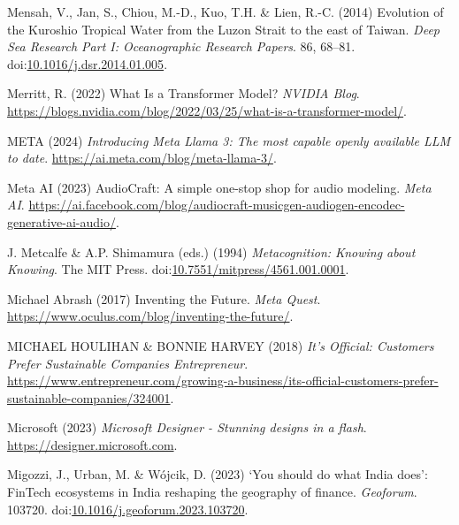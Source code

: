 \documentclass[
  letterpaper,
  DIV=11,
  numbers=noendperiod]{scrartcl}
\newlength{\cslhangindent}
\newenvironment{CSLReferences}[2] %
 {\begin{list}{}{%
  \setlength{\itemindent}{0pt}
  \setlength{\leftmargin}{0pt}
  \setlength{\parsep}{0pt}
  \ifodd #1
   \setlength{\leftmargin}{\cslhangindent}
   \setlength{\itemindent}{-1\cslhangindent}
  \fi
  \setlength{\itemsep}{#2\baselineskip}}}
 {\end{list}}
\begin{document}
\begin{CSLReferences}{0}{1}
Mensah, V., Jan, S., Chiou, M.-D., Kuo, T.H. \& Lien, R.-C. (2014)
Evolution of the {Kuroshio Tropical Water} from the {Luzon Strait} to
the east of {Taiwan}. \emph{Deep Sea Research Part I: Oceanographic
Research Papers}. 86, 68--81.
doi:\href{https://doi.org/10.1016/j.dsr.2014.01.005}{10.1016/j.dsr.2014.01.005}.

Merritt, R. (2022) What {Is} a {Transformer Model}? \emph{NVIDIA Blog}.
\url{https://blogs.nvidia.com/blog/2022/03/25/what-is-a-transformer-model/}.

META (2024) \emph{Introducing {Meta Llama} 3: {The} most capable openly
available {LLM} to date}. \url{https://ai.meta.com/blog/meta-llama-3/}.

Meta AI (2023) {AudioCraft}: {A} simple one-stop shop for audio
modeling. \emph{Meta AI}.
\url{https://ai.facebook.com/blog/audiocraft-musicgen-audiogen-encodec-generative-ai-audio/}.

J. Metcalfe \& A.P. Shimamura (eds.) (1994) \emph{Metacognition:
{Knowing} about {Knowing}}. The MIT Press.
doi:\href{https://doi.org/10.7551/mitpress/4561.001.0001}{10.7551/mitpress/4561.001.0001}.

Michael Abrash (2017) Inventing the {Future}. \emph{Meta Quest}.
\url{https://www.oculus.com/blog/inventing-the-future/}.

MICHAEL HOULIHAN \& BONNIE HARVEY (2018) \emph{It's {Official}:
{Customers Prefer Sustainable Companies} {\textbar} {Entrepreneur}}.
\url{https://www.entrepreneur.com/growing-a-business/its-official-customers-prefer-sustainable-companies/324001}.

Microsoft (2023) \emph{Microsoft {Designer} - {Stunning} designs in a
flash}. \url{https://designer.microsoft.com}.

Migozzi, J., Urban, M. \& Wójcik, D. (2023) {`{You} should do what
{India} does'}: {FinTech} ecosystems in {India} reshaping the geography
of finance. \emph{Geoforum}. 103720.
doi:\href{https://doi.org/10.1016/j.geoforum.2023.103720}{10.1016/j.geoforum.2023.103720}.


\end{CSLReferences}
\end{document}
